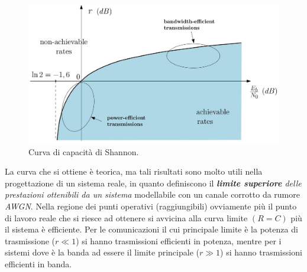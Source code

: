 \begin{figure}[H]
    \centering
    \includegraphics[scale=0.2]{img/shanno.jpg}
    \caption{Curva di capacit\`a di Shannon.}
    \label{fig:shcrv}
\end{figure}
La curva che si ottiene è teorica, ma tali risultati sono molto utili nella progettazione di un sistema reale, in quanto definiscono il \textit{\textbf{limite superiore} delle prestazioni ottenibili da un sistema} modellabile con un canale corrotto da rumore \textit{AWGN}. Nella regione dei punti operativi (raggiungibili) ovviamente più il punto di lavoro reale che si riesce ad ottenere si avvicina alla curva limite $(R=C)$ più il sistema è efficiente. Per le comunicazioni il cui principale limite è la potenza di trasmissione ($r \ll 1$) si hanno trasmissioni efficienti in potenza, mentre per i sistemi dove è la banda ad essere il limite principale ($r \gg 1$) si hanno trasmissioni efficienti in banda.